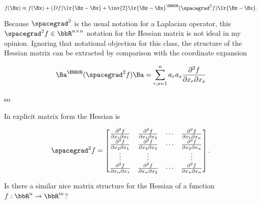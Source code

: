 \begin{dmath}\label{eqn:jacobianAndHessian:380}
f(\Bz)
\approx f(\Bx) + (D f) \lr{ \Bz - \Bx }
+ \inv{2} \lr{ \Bz - \Bx }^\T (\spacegrad^2 f) \lr{ \Bz - \Bx }.
\end{dmath}

Because \( \spacegrad^2 \) is the usual notation for a Laplacian operator, this \( \spacegrad^2 f \in \bbR^{n \times n}\) notation for the Hessian matrix is not ideal in my opinion.  Ignoring that notational objection for this class, the structure of the Hessian matrix can be extracted by comparison with the coordinate expansion

\begin{dmath}\label{eqn:jacobianAndHessian:300}
\Ba^\T (\spacegrad^2 f) \Ba
=
\sum_{r,s = 1}^n a_r a_s \frac{\partial^2 f}{\partial x_r \partial x_s}
\end{dmath}

so

In explicit matrix form the Hessian is

\begin{dmath}\label{eqn:jacobianAndHessian:340}
\spacegrad^2 f
=
\begin{bmatrix}
\frac{\partial^2 f}{\partial x_1 \partial x_1} & \frac{\partial^2 f}{\partial x_1 \partial x_2} & \cdots &\frac{\partial^2 f}{\partial x_1 \partial x_n} \\
\frac{\partial^2 f}{\partial x_2 \partial x_1} & \frac{\partial^2 f}{\partial x_2 \partial x_2} & \cdots &\frac{\partial^2 f}{\partial x_2 \partial x_n} \\
\vdots & \vdots & & \vdots \\
\frac{\partial^2 f}{\partial x_n \partial x_1} & \frac{\partial^2 f}{\partial x_n \partial x_2} & \cdots &\frac{\partial^2 f}{\partial x_n \partial x_n}
\end{bmatrix}.
\end{dmath}

Is there a similar nice matrix structure for the Hessian of a function \( f : \bbR^n \rightarrow \bbR^m \)?

